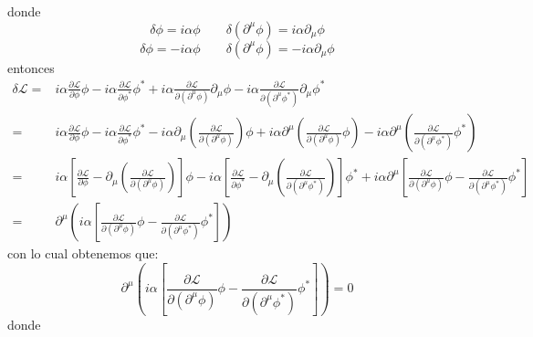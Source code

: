 \begin{itemize}
\begin{equation*}
    \end{equation*}
    donde \begin{equation*}
        \delta \phi = i\alpha \phi \qquad \delta (\partial^\mu\phi) = i\alpha \partial_\mu  \phi
    \end{equation*}
    \begin{equation*}
        \delta \phi = -i\alpha \phi \qquad \delta (\partial^\mu\phi) = -i\alpha \partial_\mu  \phi
    \end{equation*}
    entonces\begin{align*}
        \delta \mathcal{L} =& i\alpha \frac{\partial \mathcal{L}}{\partial \phi} \phi-i\alpha \frac{\partial \mathcal{L}}{\partial \phi^*} \phi^* + i\alpha \frac{\partial \mathcal{L}}{\partial (\partial^\mu \phi)} \partial_\mu \phi - i\alpha \frac{\partial \mathcal{L}}{\partial (\partial^\mu {\phi}^*)} \partial_\mu {\phi}^*\\
        =& i\alpha \frac{\partial \mathcal{L}}{\partial \phi } \phi -i\alpha \frac{\partial \mathcal{L}}{\partial \phi^* } \phi^* -i\alpha \partial_\mu \left(\frac{\partial \mathcal{L}}{\partial (\partial^\mu \phi)}\right) \phi + i\alpha \partial^\mu \left( \frac{\partial \mathcal{L}}{\partial (\partial^\mu \phi)} \phi \right) - i\alpha\partial^\mu \left( \frac{\partial \mathcal{L}}{\partial (\partial^\mu {\phi}^*)} {\phi}^* \right) \\
        =& i\alpha \left[ \frac{\partial \mathcal{L}}{\partial \phi} - \partial_\mu \left(\frac{\partial \mathcal{L}}{\partial (\partial^\mu \phi)}\right) \right] \phi-i\alpha \left[ \frac{\partial \mathcal{L}}{\partial \phi^*} - \partial_\mu \left(\frac{\partial \mathcal{L}}{\partial (\partial^\mu \phi^*)}\right) \right] \phi^*  + i\alpha \partial^\mu \left[ \frac{\partial \mathcal{L}}{\partial (\partial^\mu \phi)} \phi  - \frac{\partial \mathcal{L}}{\partial (\partial^\mu {\phi}^*)} {\phi}^* \right]\\
        =& \partial^\mu \left(i\alpha\left[ \frac{\partial \mathcal{L}}{\partial (\partial^\mu \phi)} \phi  - \frac{\partial \mathcal{L}}{\partial (\partial^\mu {\phi}^*)} {\phi}^* \right]\right)
    \end{align*}
    con lo cual obtenemos que:
    \begin{equation*}
        \partial^\mu \left(i\alpha\left[ \frac{\partial \mathcal{L}}{\partial (\partial^\mu \phi)} \phi  - \frac{\partial \mathcal{L}}{\partial (\partial^\mu {\phi}^*)} {\phi}^* \right]\right) = 0
    \end{equation*}
    donde 
     \begin{equation*}

\end{equation*}
\end{itemize}
